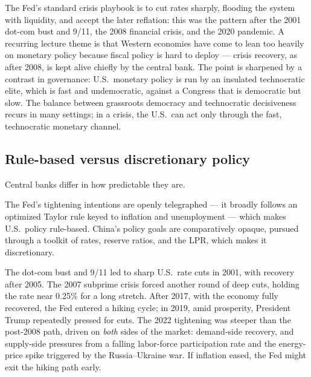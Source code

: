 \begin{remark}
The Fed's standard crisis playbook is to cut rates sharply, flooding the system with liquidity, and accept the later reflation: this was the pattern after the 2001 dot-com bust and 9/11, the 2008 financial crisis, and the 2020 pandemic. A recurring lecture theme is that Western economies have come to lean too heavily on monetary policy because fiscal policy is hard to deploy --- crisis recovery, as after 2008, is kept alive chiefly by the central bank. The point is sharpened by a contrast in governance: U.S.\ monetary policy is run by an insulated technocratic elite, which is fast and undemocratic, against a Congress that is democratic but slow. The balance between grassroots democracy and technocratic decisiveness recurs in many settings; in a crisis, the U.S.\ can act only through the fast, technocratic monetary channel.
\end{remark}

\subsection{Rule-based versus discretionary policy}

Central banks differ in how predictable they are.


The Fed's tightening intentions are openly telegraphed --- it broadly follows an optimized Taylor rule keyed to inflation and unemployment --- which makes U.S.\ policy rule-based. China's policy goals are comparatively opaque, pursued through a toolkit of rates, reserve ratios, and the LPR, which makes it discretionary.

\begin{remark}
The dot-com bust and 9/11 led to sharp U.S.\ rate cuts in 2001, with recovery after 2005. The 2007 subprime crisis forced another round of deep cuts, holding the rate near 0.25\% for a long stretch. After 2017, with the economy fully recovered, the Fed entered a hiking cycle; in 2019, amid prosperity, President Trump repeatedly pressed for cuts. The 2022 tightening was steeper than the post-2008 path, driven on \emph{both} sides of the market: demand-side recovery, and supply-side pressures from a falling labor-force participation rate and the energy-price spike triggered by the Russia--Ukraine war. If inflation eased, the Fed might exit the hiking path early.
\end{remark}

